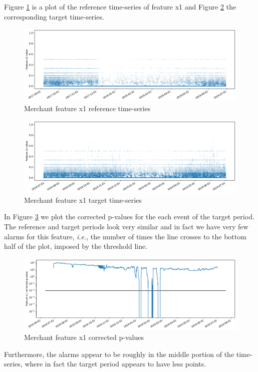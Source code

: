 Figure \ref{fig:merchant-x1-reference} is a plot of the reference time-series of feature x1 and Figure \ref{fig:merchant-x1-target} the corresponding target time-series.
\begin{figure}[!htb]
    \begin{center}
      \includegraphics[scale=0.5]{figures/merchant-x1-reference.pdf}
      \caption{Merchant feature x1 reference time-series}
      \label{fig:merchant-x1-reference}
    \end{center}
\end{figure}
\begin{figure}[!htb]
    \begin{center}
      \includegraphics[scale=0.5]{figures/merchant-x1-target.pdf}
      \caption{Merchant feature x1 target time-series}
      \label{fig:merchant-x1-target}
    \end{center}
\end{figure}
In Figure \ref{fig:merchant-x1-correctedpvalues} we plot the corrected p-values for the each event of the target period. The reference and target periods look very similar and in fact we have very few alarms for this feature, \textit{i.e.}, the number of times the line crosses to the bottom half of the plot, imposed by the threshold line. 
\begin{figure}[!htb]
    \begin{center}
      \includegraphics[scale=0.5]{figures/merchant-x1-correctedpvalues.pdf}
      \caption{Merchant feature x1 corrected p-values}
      \label{fig:merchant-x1-correctedpvalues}
    \end{center}
\end{figure}
Furthermore, the alarms appear to be roughly in the middle portion of the time-series, where in fact the target period appears to have less points.

